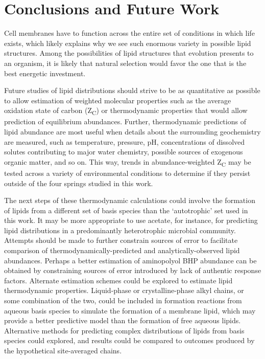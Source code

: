 \chapter{Conclusions and Future Work}

Cell membranes have to function across the entire set of conditions in which life exists, which likely explains why we see such enormous variety in possible lipid structures. Among the possibilities of lipid structures that evolution presents to an organism, it is likely that natural selection would favor the one that is the best energetic investment.

Future studies of lipid distributions should strive to be as quantitative as possible to allow estimation of weighted molecular properties such as the average oxidation state of carbon (Z\textsubscript{C}) or thermodynamic properties that would allow prediction of equilibrium abundances. Further, thermodynamic predictions of lipid abundance are most useful when details about the surrounding geochemistry are measured, such as temperature, pressure, pH, concentrations of dissolved solutes contributing to major water chemistry, possible sources of exogenous organic matter, and so on. This way, trends in abundance-weighted Z\textsubscript{C} may be tested across a variety of environmental conditions to determine if they persist outside of the four springs studied in this work.

The next steps of these thermodynamic calculations could involve the formation of lipids from a different set of basis species than the `autotrophic' set used in this work. It may be more appropriate to use acetate, for instance, for predicting lipid distributions in a predominantly heterotrophic microbial community. Attempts should be made to further constrain sources of error to facilitate comparison of thermodynamically-predicted and analytically-observed lipid abundances. Perhaps a better estimation of aminopolyol BHP abundance can be obtained by constraining sources of error introduced by lack of authentic response factors. Alternate estimation schemes could be explored to estimate lipid thermodynamic properties. Liquid-phase or crystalline-phase alkyl chains, or some combination of the two, could be included in formation reactions from aqueous basis species to simulate the formation of a membrane lipid, which may provide a better predictive model than the formation of free aqueous lipids. Alternative methods for predicting complex distributions of lipids from basis species could explored, and results could be compared to outcomes produced by the hypothetical site-averaged chains.

